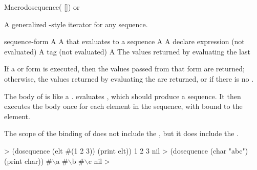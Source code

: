 \documentclass[10pt,twoside,english,pdftex]{article}
\begin{document}
\begin{functiondoc}{Macro}{dosequence}{( 
  []) \superstar{} 
  \returns{} \superstar or \nil}
%
  
\fnsyntax

\fnpurpose A generalized -style iterator for any sequence.

\fnpackage {}

\fnmodule {}

\fnargs
\begin{args}{sequence-form}
\arg[var] A 
 A  that evaluates to a sequence
 A 
\arg[declarations] A declare expression (not evaluated)
\arg[tag] A  tag (not evaluated)
\arg[form] A 
\arg[results] The values returned by evaluating the last 
\end{args}

\fnreturns If a  or  form is executed,
then the values passed from that form are returned; otherwise, the values
returned by evaluating the  are returned, or \nil{}
if there is no .

\fndescription The body of  is like a
.   evaluates
, which should produce a sequence. It then executes
the body once for each element in the sequence, with  bound to the
element.

The scope of the binding of  does not include the
, but it does include the .

\fnexamples
%
\W\supp
\begin{example}
  > (dosequence (elt #(1 2 3)) (print elt))
  1 
  2 
  3 
  nil\goodpagebreak
  > (dosequence (char "abc") (print char))
  #\(\backslash\)a 
  #\(\backslash\)b 
  #\(\backslash\)c
  nil
  >
\end{example}

\end{functiondoc}

\end{document}
